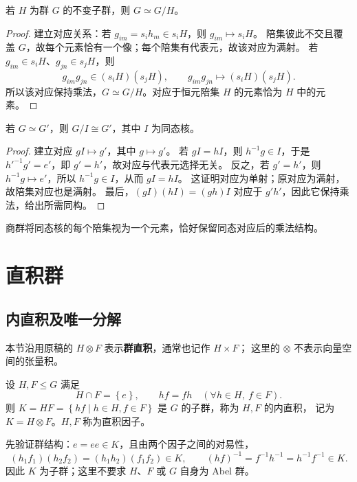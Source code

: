 \begin{theorem}
若 $H$ 为群 $G$ 的不变子群，则 $G\simeq G/H$。
\end{theorem}
\begin{proof}
建立对应关系：若 $g_{im}=s_ih_m\in s_iH$，则 $g_{im}\mapsto s_iH$。
陪集彼此不交且覆盖 $G$，故每个元素恰有一个像；每个陪集有代表元，故该对应为满射。
若 $g_{im}\in s_iH$、$g_{jn}\in s_jH$，则
\begin{equation}
g_{im}g_{jn}\in\left(s_iH\right)\left(s_jH\right),\qquad
g_{im}g_{jn}\mapsto\left(s_iH\right)\left(s_jH\right).
\end{equation}
所以该对应保持乘法，$G\simeq G/H$。对应于恒元陪集 $H$ 的元素恰为 $H$ 中的元素。
\end{proof}

\begin{theorem}
若 $G\simeq G'$，则 $G/I\cong G'$，其中 $I$ 为同态核。
\end{theorem}
\begin{proof}
建立对应 $gI\mapsto g'$，其中 $g\mapsto g'$。
若 $gI=hI$，则 $h^{-1}g\in I$，于是 $h'^{-1}g'=e'$，即 $g'=h'$，故对应与代表元选择无关。
反之，若 $g'=h'$，则 $h^{-1}g\mapsto e'$，所以 $h^{-1}g\in I$，从而 $gI=hI$。
这证明对应为单射；原对应为满射，故陪集对应也是满射。
最后，$\left(gI\right)\left(hI\right)=\left(gh\right)I$ 对应于 $g'h'$，因此它保持乘法，给出所需同构。
\end{proof}
商群将同态核的每个陪集视为一个元素，恰好保留同态对应后的乘法结构。

\section{直积群}
\subsection{内直积及唯一分解}
本节沿用原稿的 $H\otimes F$ 表示\textbf{群直积}，通常也记作 $H\times F$；
这里的 $\otimes$ 不表示向量空间的张量积。

\begin{definition}[内直积]
设 $H,F\leq G$ 满足
\begin{equation}
H\cap F=\left\{e\right\},\qquad hf=fh\quad\left(\forall h\in H,\ f\in F\right).
\end{equation}
则 $K=HF=\left\{hf\mid h\in H,f\in F\right\}$ 是 $G$ 的子群，称为 $H,F$ 的内直积，
记为 $K=H\otimes F$。$H,F$ 称为直积因子。
\end{definition}
先验证群结构：$e=ee\in K$，且由两个因子之间的对易性，
\begin{equation}
\left(h_1f_1\right)\left(h_2f_2\right)=\left(h_1h_2\right)\left(f_1f_2\right)\in K,\qquad
\left(hf\right)^{-1}=f^{-1}h^{-1}=h^{-1}f^{-1}\in K.
\end{equation}
因此 $K$ 为子群；这里不要求 $H$、$F$ 或 $G$ 自身为 Abel 群。

